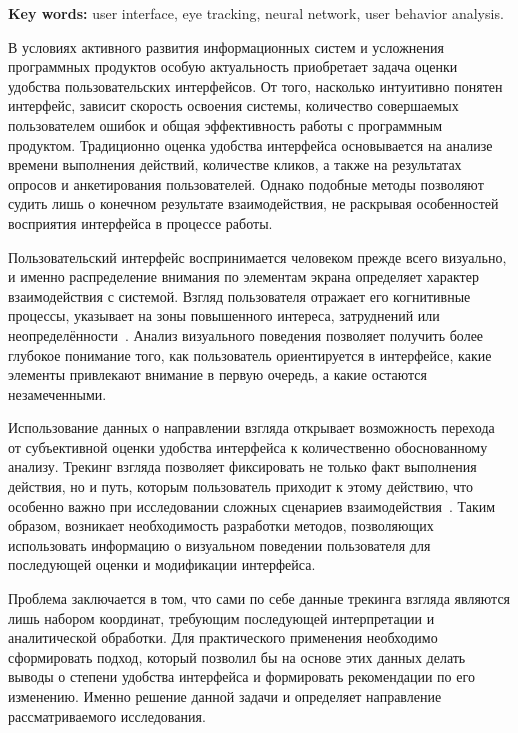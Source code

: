 \documentclass[12pt,a4paper]{article}
\begin{document}
\vspace{0.3cm}

\noindent
\textbf{Key words:}
user interface, eye tracking, neural network, user behavior analysis.

\vspace{0.8cm}

В условиях активного развития информационных систем и усложнения
программных продуктов особую актуальность приобретает задача оценки
удобства пользовательских интерфейсов. От того, насколько интуитивно
понятен интерфейс, зависит скорость освоения системы, количество
совершаемых пользователем ошибок и общая эффективность работы с
программным продуктом. Традиционно оценка удобства интерфейса
основывается на анализе времени выполнения действий, количестве кликов,
а также на результатах опросов и анкетирования пользователей. Однако
подобные методы позволяют судить лишь о конечном результате
взаимодействия, не раскрывая особенностей восприятия интерфейса
в процессе работы.

Пользовательский интерфейс воспринимается человеком прежде всего
визуально, и именно распределение внимания по элементам экрана
определяет характер взаимодействия с системой. Взгляд пользователя
отражает его когнитивные процессы, указывает на зоны повышенного
интереса, затруднений или неопределённости~\cite{eyetracking2025}. Анализ визуального
поведения позволяет получить более глубокое понимание того, как
пользователь ориентируется в интерфейсе, какие элементы привлекают
внимание в первую очередь, а какие остаются незамеченными.

Использование данных о направлении взгляда открывает возможность
перехода от субъективной оценки удобства интерфейса к количественно
обоснованному анализу. Трекинг взгляда позволяет фиксировать не только
факт выполнения действия, но и путь, которым пользователь приходит
к этому действию, что особенно важно при исследовании сложных
сценариев взаимодействия~\cite{usabilitylab2025}. Таким образом, возникает необходимость
разработки методов, позволяющих использовать информацию о визуальном
поведении пользователя для последующей оценки и модификации интерфейса.

Проблема заключается в том, что сами по себе данные трекинга взгляда
являются лишь набором координат, требующим последующей интерпретации
и аналитической обработки. Для практического применения необходимо
сформировать подход, который позволил бы на основе этих данных делать
выводы о степени удобства интерфейса и формировать рекомендации
по его изменению. Именно решение данной задачи и определяет направление
рассматриваемого исследования.
\end{document}
